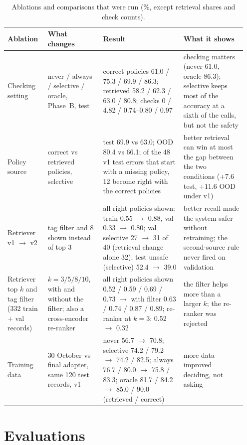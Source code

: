 \documentclass[10pt]{article}
\begin{document}
\begin{table}[h]
\centering\footnotesize
\setlength{\tabcolsep}{4pt}
\begin{tabular}{@{}L{0.16\linewidth}L{0.22\linewidth}L{0.32\linewidth}L{0.25\linewidth}@{}}
\toprule
\textbf{Ablation} & \textbf{What changes} & \textbf{Result} & \textbf{What it shows}\\
\midrule
Checking setting & never / always / selective / oracle, Phase~B, test & correct policies 61.0 / 75.3 / 69.9 / 86.3; retrieved 58.2 / 62.3 / 63.0 / 80.8; checks 0 / 4.82 / 0.74--0.80 / 0.97 & checking matters (never 61.0, oracle 86.3); selective keeps most of the accuracy at a sixth of the calls, but not the safety\\
Policy source & correct vs retrieved policies, selective & test 69.9 vs 63.0; OOD 80.4 vs 66.1; of the 48 v1 test errors that start with a missing policy, 12 become right with the correct policies & better retrieval can win at most the gap between the two conditions ($+7.6$ test, $+11.6$ OOD under v1)\\
Retriever v1 $\rightarrow$ v2 & tag filter and 8 shown instead of top 3 & all right policies shown: train 0.55 $\rightarrow$ 0.88, val 0.33 $\rightarrow$ 0.80; val selective 27 $\rightarrow$ 31 of 40 (retrieval change alone 32); test unsafe (selective) 52.4 $\rightarrow$ 39.0 & better recall made the system safer without retraining; the second-source rule never fired on validation\\
Retriever top $k$ and tag filter (332 train + val records) & $k = 3 / 5 / 8 / 10$, with and without the filter; also a cross-encoder re-ranker & all right policies shown 0.52 / 0.59 / 0.69 / 0.73 $\rightarrow$ with filter 0.63 / 0.74 / 0.87 / 0.89; re-ranker at $k=3$: 0.52 $\rightarrow$ 0.32 & the filter helps more than a larger $k$; the re-ranker was rejected\\
Training data & 30 October vs final adapter, same 120 test records, v1 & never 56.7 $\rightarrow$ 70.8; selective 74.2 / 79.2 $\rightarrow$ 74.2 / 82.5; always 76.7 / 80.0 $\rightarrow$ 75.8 / 83.3; oracle 81.7 / 84.2 $\rightarrow$ 85.0 / 90.0 (retrieved / correct) & more data improved deciding, not asking\\
\bottomrule
\end{tabular}
\caption{Ablations and comparisons that were run (\%, except retrieval shares and check counts).}
\label{tab:abl}
\end{table}


\section{Evaluations}
\end{document}
